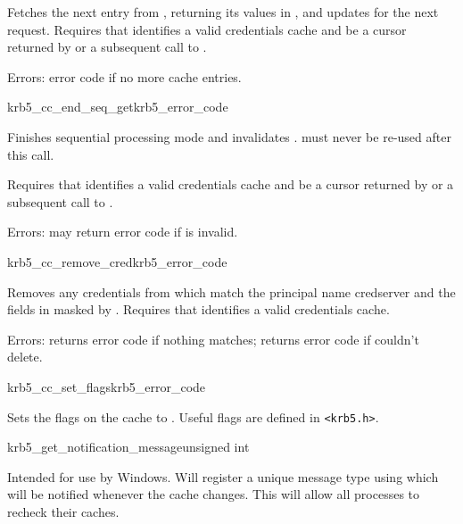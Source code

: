 Fetches the next entry from , returning its values in
, and updates  for the next request.
Requires that  identifies a valid credentials cache and
 be a cursor returned by
 or a subsequent call to
.

Errors: error code if no more cache entries.

\begin{funcdecl}{krb5_cc_end_seq_get}{krb5_error_code}{\funcinout}
\end{funcdecl}

Finishes sequential processing mode and invalidates .
 must never be re-used after this call.

Requires that  identifies a valid credentials cache and
 be a cursor returned by
 or a subsequent call to
.

Errors: may return error code if  is invalid.


\begin{funcdecl}{krb5_cc_remove_cred}{krb5_error_code}{\funcinout}
\funcin
{}
\end{funcdecl}

Removes any credentials from  which match the principal
name {cred{\ptsto}server} and the fields in  masked by
.
Requires that  identifies a valid credentials cache.

Errors: returns error code if nothing matches; returns error code if
couldn't delete.

\begin{funcdecl}{krb5_cc_set_flags}{krb5_error_code}{\funcinout}
\funcin
{}
\end{funcdecl}

Sets the flags on the cache  to .  Useful
flags are defined in {\tt <krb5.h>}.

\begin{funcdecl}{krb5_get_notification_message}{unsigned int}{\funcvoid}
\end{funcdecl}

Intended for use by Windows. Will register a unique message type using
 which will be notified whenever the
cache changes. This will allow all processes to recheck their caches.
